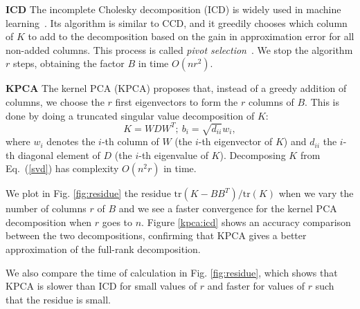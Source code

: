 \textbf{ICD} The incomplete Cholesky decomposition (ICD) is widely used in machine learning~\cite{BaJo02,BaJo05,FiSc01}. Its algorithm is similar to CCD, and it greedily chooses which column of $K$ to add to the decomposition based on the gain in approximation error for all non-added columns. This process is called \emph{pivot selection}~\cite{BaJo05}. We stop the algorithm $r$ steps, obtaining the factor $B$ in time $O(nr^2)$.

\textbf{KPCA} The kernel PCA (KPCA) proposes that, instead of a greedy addition of columns, we choose the $r$ first eigenvectors to form the $r$ columns of $B$. This is done by doing a truncated singular value decomposition of $K$:
\begin{equation}
    K = WDW^T; \ b_i = \sqrt{d_{ii}}w_i, \label{svd}
\end{equation}
where $w_i$ denotes the $i$-th column of $W$ (\ie the $i$-th eigenvector of $K$) and $d_{ii}$ the $i$-th diagonal element of $D$ (\ie the $i$-th eigenvalue of $K$). Decomposing $K$ from Eq.~(\ref{svd}) has complexity $O(n^2r)$ in time.~\cite{golub2012matrix}

We plot in Fig. \ref{fig:residue} the residue $\mathrm{tr}(K-BB^T)/\mathrm{tr}(K)$ when we vary the number of columns $r$ of $B$ and we see a faster convergence for the kernel PCA decomposition when $r$ goes to $n$. Figure \ref{kpca:icd} shows an accuracy comparison between the two decompositions, confirming that KPCA gives a better approximation of the full-rank decomposition.



We also compare the time of calculation in Fig. \ref{fig:residue}, which shows that KPCA is slower than ICD for small values of $r$ and faster for values of $r$ such that the residue is small.



